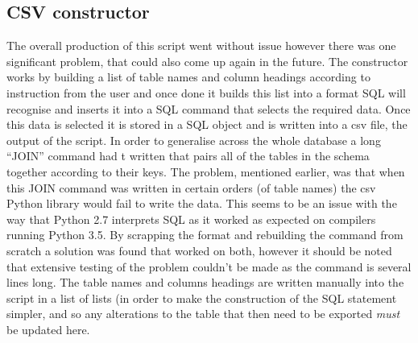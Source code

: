 \documentclass[11pt, a4paper]{article}
\begin{document}
\begin{multicols}{2}
\subsection{CSV constructor}
The overall production of this script went without issue however there was one significant problem, that could also come up again in the future. The constructor works by building a list of table names and column headings according to instruction from the user and once done it builds this list into a format SQL will recognise and inserts it into a SQL command that selects the required data. Once this data is selected it is stored in a SQL object and is written into a csv file, the output of the script. In order to generalise across the whole database a long ``JOIN'' command had t written that pairs all of the tables in the schema together according to their keys. The problem, mentioned earlier, was that when this JOIN command was written in certain orders (of table names) the csv Python library would fail to write the data. This seems to be an issue with the way that Python 2.7 interprets SQL as it worked as expected on compilers running Python 3.5. By scrapping the format and rebuilding the command from scratch a solution was found that worked on both, however it should be noted that extensive testing of the problem couldn't be made as the command is several lines long. The table names and columns headings are written manually into the script in a list of lists (in order to make the construction of the SQL statement simpler, and so any alterations to the table that then need to be exported \textit{must} be updated here. 

\end{multicols}
\end{document}
